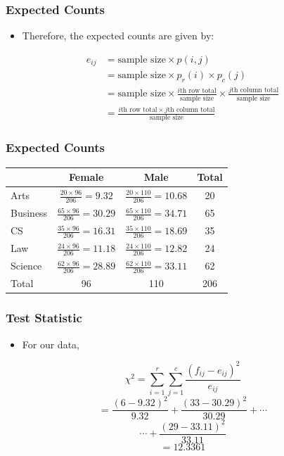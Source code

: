 \documentclass[12pt]{beamer}
\begin{document}
\begin{frame}
	\frametitle{Expected Counts}
	
	\begin{itemize}[label={\color{blue}$\blacktriangleright$}]
		\item Therefore, the expected counts are given by:
	\end{itemize}
	
	\medskip
	
	\begin{align*}
		e_{ij} &= \text{sample size} \times p(i,j) \\
		&= \text{sample size} \times p_r(i) \times p_c(j) \\
		&= \text{sample size} \times \frac{\text{$i$th row total}}{\text{sample size}} \times \frac{\text{$j$th column total}}{\text{sample size}} \\
		&= \frac{\text{$i$th row total} \times \text{$j$th column total}}{\text{sample size}}
	\end{align*}
	
\end{frame}
\begin{frame}
	\frametitle{Expected Counts}
	
	\begin{center}
		\begin{tabular}{lccc}
			\toprule
			& Female & Male & Total \\
			\midrule
			Arts & $\frac{20 \times 96}{206} = 9.32$ & $\frac{20 \times 110}{206} = 10.68$ & 20 \\[2ex]
			Business & $\frac{65 \times 96}{206} = 30.29$ & $\frac{65 \times 110}{206} = 34.71$ & 65 \\[2ex]
			CS & $\frac{35 \times 96}{206} = 16.31$ & $\frac{35 \times 110}{206} = 18.69$ & 35 \\[2ex]
			Law & $\frac{24 \times 96}{206} = 11.18$ & $\frac{24 \times 110}{206} = 12.82$ & 24 \\[2ex]
			Science & $\frac{62 \times 96}{206} = 28.89$ & $\frac{62 \times 110}{206} = 33.11$ & 62 \\[2ex]
			\midrule
			Total & 96 & 110 & 206 \\
			\bottomrule
		\end{tabular}
	\end{center}
	
\end{frame}
\begin{frame}
	\frametitle{Test Statistic}
	
	\begin{itemize}[label={\color{blue}$\blacktriangleright$}]
		\item For our data,
	\end{itemize}
	
	\medskip
	
	\[
	\chi^2 = \sum_{i=1}^r \sum_{j=1}^c \frac{(f_{ij} - e_{ij})^2}{e_{ij}}
	\]
	\[
	= \frac{(6 - 9.32)^2}{9.32} + \frac{(33 - 30.29)^2}{30.29} + \cdots
	\]
	\[
	\cdots + \frac{(29 - 33.11)^2}{33.11}
	\]
	\[
	= 12.3361
	\]
	
\end{frame}
\end{document}
